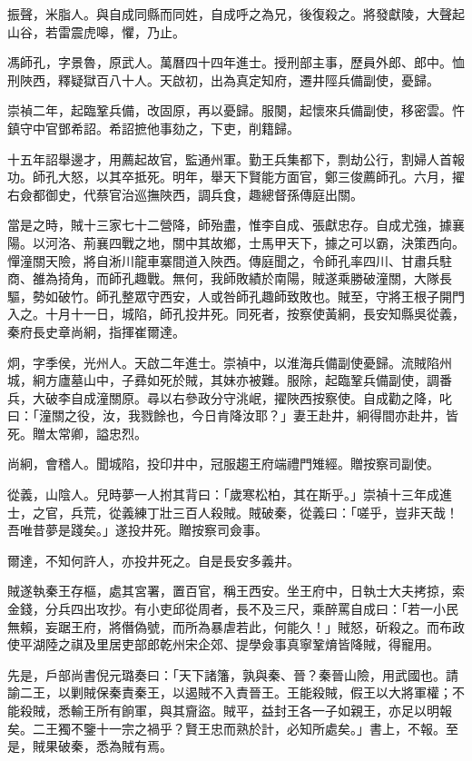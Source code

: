 \begin{pinyinscope}
{{振聲，米脂人。與自成同縣而同姓，自成呼之為兄，後復殺之。將發獻陵，大聲起山谷，若雷震虎嗥，懼，乃止。

馮師孔，字景魯，原武人。萬曆四十四年進士。授刑部主事，歷員外郎、郎中。恤刑陜西，釋疑獄百八十人。天啟初，出為真定知府，遷井陘兵備副使，憂歸。

崇禎二年，起臨鞏兵備，改固原，再以憂歸。服闋，起懷來兵備副使，移密雲。忤鎮守中官鄧希詔。希詔摭他事劾之，下吏，削籍歸。

十五年詔舉邊才，用薦起故官，監通州軍。勤王兵集都下，剽劫公行，割婦人首報功。師孔大怒，以其卒抵死。明年，舉天下賢能方面官，鄭三俊薦師孔。六月，擢右僉都御史，代蔡官治巡撫陜西，調兵食，趣總督孫傳庭出關。

當是之時，賊十三家七十二營降，師殆盡，惟李自成、張獻忠存。自成尤強，據襄陽。以河洛、荊襄四戰之地，關中其故鄉，士馬甲天下，據之可以霸，決策西向。憚潼關天險，將自淅川龍車寨間道入陜西。傳庭聞之，令師孔率四川、甘肅兵駐商、雒為掎角，而師孔趣戰。無何，我師敗績於南陽，賊遂乘勝破潼關，大隊長驅，勢如破竹。師孔整眾守西安，人或咎師孔趣師致敗也。賊至，守將王根子開門入之。十月十一日，城陷，師孔投井死。同死者，按察使黃絅，長安知縣吳從義，秦府長史章尚絅，指揮崔爾達。

炯，字季侯，光州人。天啟二年進士。崇禎中，以淮海兵備副使憂歸。流賊陷州城，絅方廬墓山中，子彞如死於賊，其妹亦被難。服除，起臨鞏兵備副使，調番兵，大破李自成潼關原。尋以右參政分守洮岷，擢陜西按察使。自成勸之降，叱曰：「潼關之役，汝，我戮餘也，今日肯降汝耶？」妻王赴井，絅得間亦赴井，皆死。贈太常卿，謚忠烈。

尚絅，會稽人。聞城陷，投印井中，冠服趨王府端禮門雉經。贈按察司副使。

從義，山陰人。兒時夢一人拊其背曰：「歲寒松柏，其在斯乎。」崇禎十三年成進士，之官，兵荒，從義練丁壯三百人殺賊。賊破秦，從義曰：「嗟乎，豈非天哉！吾唯昔夢是踐矣。」遂投井死。贈按察司僉事。

爾達，不知何許人，亦投井死之。自是長安多義井。

賊遂執秦王存樞，處其宮署，置百官，稱王西安。坐王府中，日執士大夫拷掠，索金錢，分兵四出攻抄。有小吏邱從周者，長不及三尺，乘醉罵自成曰：「若一小民無賴，妄踞王府，將僭偽號，而所為暴虐若此，何能久！」賊怒，斫殺之。而布政使平湖陸之祺及里居吏部郎乾州宋企郊、提學僉事真寧鞏焴皆降賊，得寵用。

先是，戶部尚書倪元璐奏曰：「天下諸籓，孰與秦、晉？秦晉山險，用武國也。請諭二王，以剿賊保秦責秦王，以遏賊不入責晉王。王能殺賊，假王以大將軍權；不能殺賊，悉輸王所有餉軍，與其齎盜。賊平，益封王各一子如親王，亦足以明報矣。二王獨不鑒十一宗之禍乎？賢王忠而熟於計，必知所處矣。」書上，不報。至是，賊果破秦，悉為賊有焉。

}}
\end{pinyinscope}
